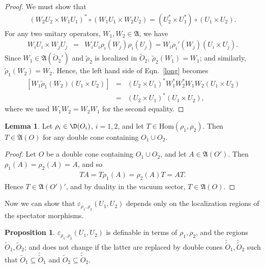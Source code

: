 \documentclass[12pt]{article}
\newcommand{\alg}[1]{\mathfrak{#1}}
\theoremstyle{definition}
\newtheorem{prop}[thm]{Proposition}
\newtheorem{lemma}[thm]{Lemma}
\theoremstyle{definition}
\theoremstyle{remark}
\newcommand{\ve}{\varepsilon}
\def\wt#1{{\tilde #1}}
\newcommand{\Hom}{\mathrm{Hom}}
\begin{document}
\begin{proof} We must show that
  \begin{eqnarray} (W_2U_2\times W_1U_1)^*\circ (W_1U_1\times W_2U_2) = (U_2^*\times
    U_1^*)\circ (U_1\times U_2) .\label{long} \end{eqnarray} For any two unitary
  operators, $W_1,W_2\in \alg{A}$, we have
\begin{eqnarray*} W_iU_i\times W_jU_j &=& W_iU_i\rho _i(W_j)\rho _i(U_j) = W_i\rho
  _i'(W_j)(U_i\times U_j) .\end{eqnarray*} Since $W_1\in \alg{A}({{\wt O}_2}')$ and $\wt
\rho _2$ is localized in $\wt O_2$, $\wt \rho _2(W_1)=W_1$; and similarly, $\wt \rho
_1(W_2)=W_2$.  Hence, the left hand side of Eqn.\ \ref{long} becomes
\begin{eqnarray*}
  [(U_2\times U_1)^*\wt \rho _2(W_1^*)W_2^*]\, [W_1\wt \rho _1(W_2)(U_1\times U_2)]  &=& (U_2\times U_1)^*W_1^*W_2^*W_1W_2(U_1\times U_2) \\
  &=& (U_2\times U_1)^*(U_1\times U_2) ,\end{eqnarray*} where we used $W_1W_2=W_2W_1$
for the second equality. \end{proof}

\newcommand{\dt}[1]{\tilde{\tilde{#1}}}

\begin{lemma} Let $\rho _i\in \D (O_i)$, $i=1,2$, and let $T\in \Hom (\rho _1,\rho
  _2)$.  Then $T\in \alg{A}(O)$ for any double cone containing $O_1\cup O_2$.
  \label{hom-loc}
\end{lemma}

\begin{proof} Let $O$ be a double cone containing $O_1\cup O_2$, and let $A\in
  \alg{A}(O')$.  Then $\rho _1(A)=\rho _2(A)=A$, and so
  \begin{eqnarray*} TA=T\rho _1(A)=\rho _2(A)T =AT .\end{eqnarray*} Hence $T\in
  \alg{A}(O')'$, and by duality in the vacuum sector, $T\in \alg{A}(O)$. \end{proof}

Now we can show that $\ve _{\rho _1,\rho _2}(U_1,U_2)$ depends only on the
localization regions of the spectator morphisms.

\begin{prop} $\ve _{\rho _1,\rho _2}(U_1,U_2)$ is definable in terms of $\rho _1
  ,\rho _2$, and the regions $\wt O_1,\wt O_2$; and does not change if the latter are
  replaced by double cones $\dt{O}_1,\dt{O}_2$ such that $\wt O_1\subseteq \dt{O}_1$
  and $\wt O_2\subseteq \dt{O}_2$. \label{perturb}
\end{prop}
\end{document}
